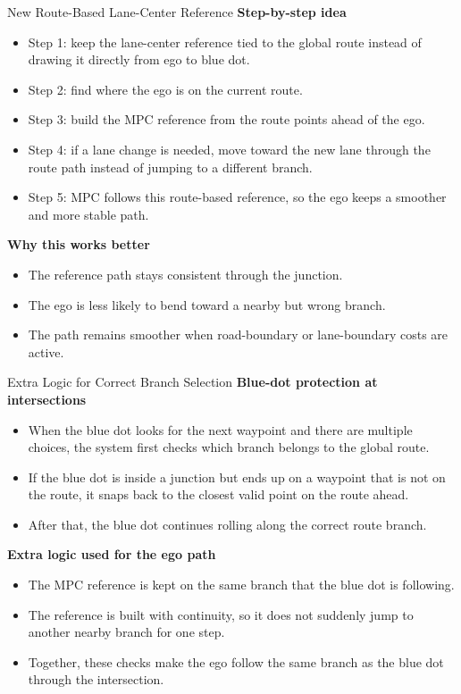 \documentclass[aspectratio=169]{beamer}
\begin{document}
\begin{frame}{New Route-Based Lane-Center Reference}
\small
\textbf{Step-by-step idea}
\begin{itemize}
\setlength\itemsep{0.55em}
\item Step 1: keep the lane-center reference tied to the global route instead of drawing it directly from ego to blue dot.
\item Step 2: find where the ego is on the current route.
\item Step 3: build the MPC reference from the route points ahead of the ego.
\item Step 4: if a lane change is needed, move toward the new lane through the route path instead of jumping to a different branch.
\item Step 5: MPC follows this route-based reference, so the ego keeps a smoother and more stable path.
\end{itemize}

\vspace{0.6em}
\textbf{Why this works better}
\begin{itemize}
\setlength\itemsep{0.45em}
\item The reference path stays consistent through the junction.
\item The ego is less likely to bend toward a nearby but wrong branch.
\item The path remains smoother when road-boundary or lane-boundary costs are active.
\end{itemize}
\end{frame}

\begin{frame}{Extra Logic for Correct Branch Selection}
\small
\textbf{Blue-dot protection at intersections}
\begin{itemize}
\setlength\itemsep{0.55em}
\item When the blue dot looks for the next waypoint and there are multiple choices, the system first checks which branch belongs to the global route.
\item If the blue dot is inside a junction but ends up on a waypoint that is not on the route, it snaps back to the closest valid point on the route ahead.
\item After that, the blue dot continues rolling along the correct route branch.
\end{itemize}

\vspace{0.6em}
\textbf{Extra logic used for the ego path}
\begin{itemize}
\setlength\itemsep{0.55em}
\item The MPC reference is kept on the same branch that the blue dot is following.
\item The reference is built with continuity, so it does not suddenly jump to another nearby branch for one step.
\item Together, these checks make the ego follow the same branch as the blue dot through the intersection.
\end{itemize}
\end{frame}
\end{document}
